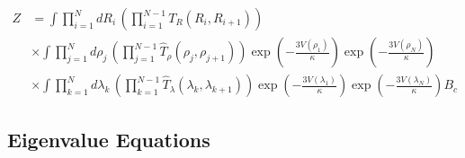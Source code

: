 %
\begin{align}\label{col_z_int_intact}
Z &= \int\prod^{N}_{i=1}dR_i\,\left(\prod^{N-1}_{i=1}T_{R}(R_i,R_{i+1})\right)\nonumber\\
&\times\int\prod^{N}_{j=1}d\rho_j\,\left(\prod^{N-1}_{j=1}\hat{T}_{\rho}(\rho_j,\rho_{j+1})\right)\exp\left(-\frac{3V(\rho_{1})}{\kappa}\right)\exp\left(-\frac{3V(\rho_{N})}{\kappa}\right)\nonumber\\
&\times\int\prod^{N}_{k=1}d\lambda_k\,\left(\prod^{N-1}_{k=1}\hat{T}_{\lambda}(\lambda_k,\lambda_{k+1})\right)\exp\left(-\frac{3V(\lambda_{1})}{\kappa}\right)\exp\left(-\frac{3V(\lambda_{N})}{\kappa}\right)B_c
\end{align}
%
\subsection{Eigenvalue Equations}

